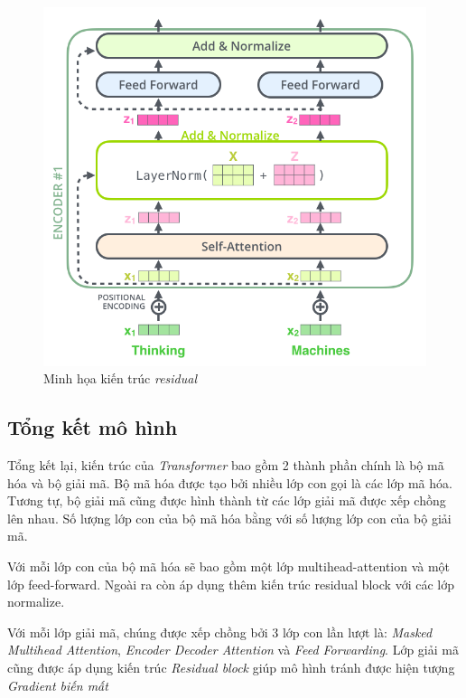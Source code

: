 \begin{figure}[H]
    \begin{center}
        \includegraphics[scale=0.5]{images/residual}
        \caption{Minh họa kiến trúc \textit{residual}\cite{illustrated.transformer}}
        \label{fig:residual}
    \end{center}
\end{figure}


\subsection{Tổng kết mô hình}

Tổng kết lại, kiến trúc của \textit{Transformer} bao gồm 2 thành phần chính là bộ mã hóa và bộ giải mã. Bộ mã hóa được tạo bởi nhiều lớp con gọi là các lớp mã hóa. Tương tự, bộ giải mã cũng được hình thành từ các lớp giải mã được xếp chồng lên nhau. Số lượng lớp con của bộ mã hóa bằng với số lượng lớp con của bộ giải mã.

Với mỗi lớp con của bộ mã hóa sẽ bao gồm một lớp multihead-attention và một lớp feed-forward. Ngoài ra còn áp dụng thêm kiến trúc residual block với các lớp normalize.

Với mỗi lớp giải mã, chúng được xếp chồng bởi 3 lớp con lần lượt là: \textit{Masked Multihead Attention}, \textit{Encoder Decoder Attention} và \textit{Feed Forwarding}. Lớp giải mã cũng được áp dụng kiến trúc \textit{Residual block} giúp mô hình tránh được hiện tượng \textit{Gradient biến mất}

